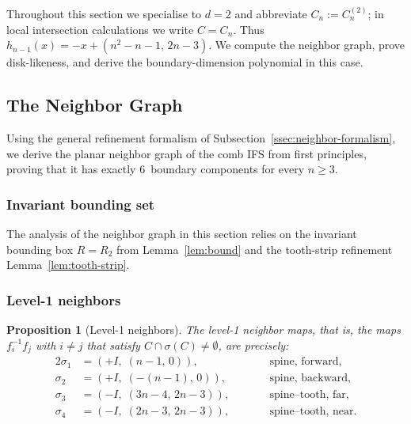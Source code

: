 \documentclass{amsart}
\newtheorem{proposition}[theorem]{Proposition}
\theoremstyle{definition}
\theoremstyle{remark}
\begin{document}
Throughout this section we specialise to $d = 2$ and abbreviate
$C_n := C_n^{(2)}$; in local intersection calculations we write
$C=C_n$.  Thus
$h_{n-1}(x) = -x + (n^2{-}n{-}1,\,2n{-}3)$.
We compute the neighbor graph, prove disk-likeness, and derive the
boundary-dimension polynomial in this case.

\subsection{The Neighbor Graph}
\label{sec:osc}

Using the general refinement formalism of
Subsection~\ref{ssec:neighbor-formalism}, we derive the planar
neighbor graph of the comb IFS from first principles, proving that it
has exactly $6$~boundary components for every $n \ge 3$.

\subsubsection{Invariant bounding set}

The analysis of the neighbor graph in this section relies on the
invariant bounding box $R = R_2$ from Lemma~\ref{lem:bound} and the
tooth-strip refinement Lemma~\ref{lem:tooth-strip}.

\subsubsection{Level-1 neighbors}

\begin{proposition}[Level-1 neighbors]\label{prop:level1}
The level-1 neighbor maps, that is, the maps \(f_i^{-1}f_j\) with
\(i\ne j\) that satisfy \(C \cap \sigma(C) \ne \emptyset\), are
precisely:
\begin{alignat*}{2}
  \sigma_1 &= (+I,\; (n{-}1,\, 0)),
    &\qquad& \text{spine, forward}, \\
  \sigma_2 &= (+I,\; (-(n{-}1),\, 0)),
    &\qquad& \text{spine, backward}, \\
  \sigma_3 &= (-I,\; (3n{-}4,\, 2n{-}3)),
    &\qquad& \text{spine--tooth, far}, \\
  \sigma_4 &= (-I,\; (2n{-}3,\, 2n{-}3)),
    &\qquad& \text{spine--tooth, near}.
\end{alignat*}
\end{proposition}
\end{document}
